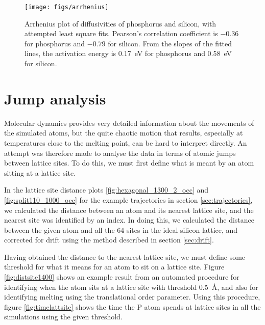 \documentclass[11pt,bibliography=totoc,index=totoc]{scrbook}   %
\begin{document}
\begin{figure}[htp]
  \centering
  \texttt{[image: figs/arrhenius]}
  \caption{Arrhenius plot of diffusivities of phosphorus and silicon, with attempted least square fits. 
      Pearson's correlation coefficient is $-0.36$ for phosphorus and $-0.79$ for silicon.
      From the slopes of the fitted lines, the activation energy is 0.17~eV for phosphorus and 0.58~eV for silicon.
  }
  \label{fig:arrhenius}
\end{figure}





%
\section{Jump analysis}
%

Molecular dynamics provides very detailed information about the movements of the simulated atoms,
but the quite chaotic motion that results, especially at temperatures close to the melting point, can be hard to interpret directly. 
An attempt was therefore made to analyse the data in terms of atomic jumps between lattice sites.
To do this, we must first define what is meant by an atom sitting at a lattice site.

In the lattice site distance plots \ref{fig:hexagonal_1300_2_occ} and \ref{fig:split110_1000_occ} for the example trajectories in section \ref{sec:trajectories},
we calculated the distance between an atom and its nearest lattice site, and the nearest site was identified by an index.
In doing this, we calculated the distance between the given atom and all the 64 sites in the ideal silicon lattice, 
and corrected for drift using the method described in section \ref{sec:drift}.

Having obtained the distance to the nearest lattice site, we must define some threshold for what it means for an atom to sit on a lattice site.
Figure \ref{fig:distsite1400} shows an example result from an automated procedure for identifying when the atom sits at a lattice site with threshold \SI{0.5}{\angstrom}, and also for identifying melting using the translational order parameter. 
Using this procedure, figure \ref{fig:timelattsite} shows the time the P atom spends at lattice sites in all the simulations using the given threshold.
\end{document}
